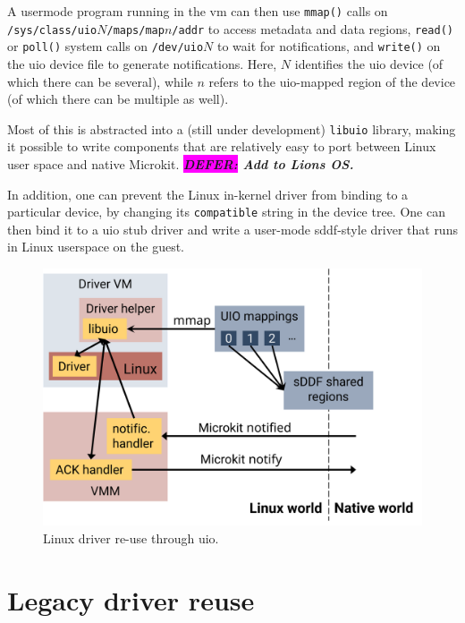 \documentclass[a4paper,12pt]{report}
\newcommand{\Comment}[1]{\textbf{\textsl{#1}}}
\newcommand{\DEFER}[1]{\textbf{\textsl{\colorbox{magenta}{DEFER:} #1}}}
\newcommand{\Comment}[1]{\relax}
\newcommand{\DEFER}[1]{\relax}
\newcommand{\gernot}[1]{\Comment{#1 \colorbox{yellow}{[gernot]}}}
\newcommand{\peterc}[1]{\Comment{#1 \colorbox{yellow}{[peterc]}}}
\newcommand{\code}[1]{\texttt{#1}}
\newcommand{\figscale}{0.2}
\begin{document}
A usermode program running in the \gls{vm} can then use \code{mmap()} calls
on
\code{/sys/class/uio}\(N\)\code{/maps/map}\(n\)\code{/addr}
to access metadata and data regions,
\code{read()} or \code{poll()} system calls  on
\code{/dev/uio}\(N\) to wait for notifications,
and \code{write()} on the \gls{uio} device file to generate
notifications. Here, \(N\) identifies the \gls{uio} device (of which there
can be several), while \(n\) refers to the \gls{uio}-mapped region of the
device (of which there can be multiple as well).

Most of this is abstracted into a (still under development) \code{libuio} library, making it
possible to write components that are relatively easy to port between
Linux user space and native Microkit. \DEFER{Add to Lions OS.}

In addition, one can prevent the Linux in-kernel driver from binding
to a particular device, by changing its \code{compatible} string in
the device tree.  One can then bind it to a \gls{uio} stub driver and write
a user-mode \gls{sddf}-style driver that runs in Linux userspace on the guest.

\begin{figure}[ht]
  \centering
  \includegraphics[scale=\figscale]{uio-drivers}
  \caption{Linux driver re-use through \gls{uio}.}
  \label{f:uio-drivers}
\end{figure}

\section{Legacy driver reuse}
\end{document}
